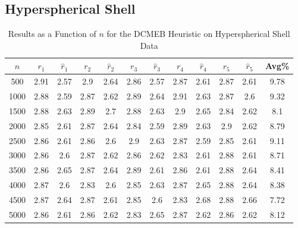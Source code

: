 \documentclass[11pt,twoside]{report}
\theoremstyle{definition}
\numberwithin{theorem}{section}
\numberwithin{definition}{section}
\numberwithin{lemma}{section}
\numberwithin{proposition}{section}
\numberwithin{equation}{section}
\numberwithin{figure}{section}
\begin{document}
\begin{appendices}
    \subsection{Hyperspherical Shell}
    \begin{table}[ht]
        \centering
        \begin{tabular}{|c||cc||cc||cc||cc||cc||c|} \hline
            $n$&$r_1$&$\hat{r}_1$&$r_2$&$\hat{r}_2$&$r_3$&$\hat{r}_3$&$r_4$&$\hat{r}_4$&$r_5$&$\hat{r}_5$&Avg\% \\ \hline
            500&2.91&2.57&2.9&2.64&2.86&2.57&2.87&2.61&2.87&2.61&9.78 \\
            1000&2.88&2.59&2.87&2.62&2.89&2.64&2.91&2.63&2.87&2.6&9.32 \\
            1500&2.88&2.63&2.89&2.7&2.88&2.63&2.9&2.65&2.84&2.62&8.1 \\
            2000&2.85&2.61&2.87&2.64&2.84&2.59&2.89&2.63&2.9&2.62&8.79 \\
            2500&2.86&2.61&2.86&2.6&2.9&2.63&2.87&2.59&2.85&2.61&9.11 \\
            3000&2.86&2.6&2.87&2.62&2.86&2.62&2.83&2.61&2.88&2.61&8.71 \\
            3500&2.86&2.65&2.87&2.64&2.89&2.61&2.86&2.61&2.88&2.64&8.41 \\
            4000&2.87&2.6&2.83&2.6&2.85&2.63&2.87&2.65&2.88&2.64&8.38 \\
            4500&2.87&2.64&2.87&2.61&2.85&2.6&2.83&2.68&2.88&2.66&7.72 \\
            5000&2.86&2.61&2.86&2.62&2.83&2.65&2.87&2.62&2.86&2.62&8.12 \\ \hline
        \end{tabular}
        \caption{Results as a Function of $n$ for the DCMEB Heuristic on Hyperspherical Shell Data}
        \label{tab:hyperspherical_shell_dcmeb_table_n}
    \end{table}
    

\end{appendices}
\end{document}
